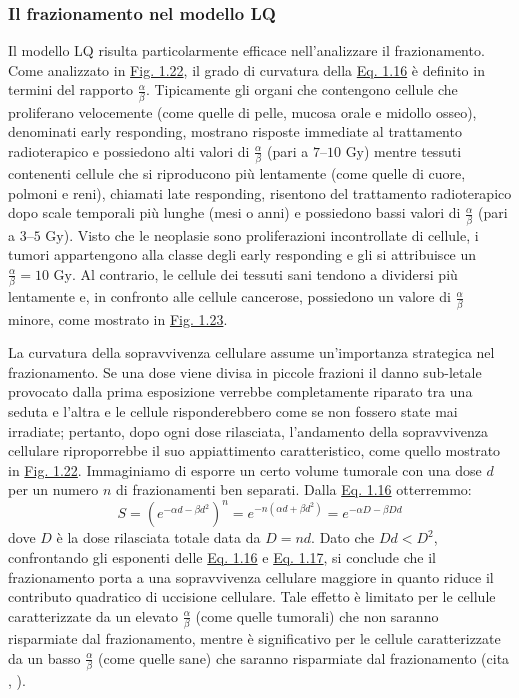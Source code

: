 \documentclass[12pt,a4paper,twoside]{report}
\begin{document}
	\subsubsection{Il frazionamento nel modello LQ}
	Il modello LQ risulta particolarmente efficace nell'analizzare il frazionamento. Come analizzato in \hyperref[fig:survival_cell]{Fig. 1.22}, il grado di curvatura della \hyperref[eq:survival2]{Eq. 1.16} è definito in termini del rapporto $\frac{\alpha}{\beta}$. Tipicamente gli organi che contengono cellule che proliferano velocemente (come quelle di pelle, mucosa orale e midollo osseo), denominati early responding, mostrano risposte immediate al trattamento radioterapico e possiedono alti valori di $\frac{\alpha}{\beta}$ (pari a $7$--$10\mbox{ Gy}$) mentre tessuti contenenti cellule che si riproducono più lentamente (come quelle di cuore, polmoni e reni), chiamati late responding, risentono del trattamento radioterapico dopo scale temporali più lunghe (mesi o anni) e possiedono bassi valori di $\frac{\alpha}{\beta}$ (pari a $3$--$5\mbox{ Gy}$). Visto che le neoplasie sono proliferazioni incontrollate di cellule, i tumori appartengono alla classe degli early responding e gli si attribuisce un $\frac{\alpha}{\beta}=10\mbox{ Gy}$. Al contrario, le cellule dei tessuti sani tendono a dividersi più lentamente e, in confronto alle cellule cancerose, possiedono un valore di $\frac{\alpha}{\beta}$ minore, come mostrato in \hyperref[fig:sparing]{Fig. 1.23}.
	
	La curvatura della sopravvivenza cellulare assume un'importanza strategica nel frazionamento. Se una dose viene divisa in piccole frazioni il danno sub-letale provocato dalla prima esposizione verrebbe completamente riparato tra una seduta e l'altra e le cellule risponderebbero come se non fossero state mai irradiate; pertanto, dopo ogni dose rilasciata, l'andamento della sopravvivenza cellulare riproporrebbe il suo appiattimento caratteristico, come quello mostrato in \hyperref[fig:survival_cell]{Fig. 1.22}. Immaginiamo di esporre un certo volume tumorale con una dose $d$ per un numero $n$ di frazionamenti ben separati. Dalla \hyperref[eq:survival2]{Eq. 1.16} otterremmo:
	\begin{equation}
		S=\left(e^{-\alpha d-\beta d^2}\right)^n=e^{-n\left(\alpha d+\beta d^2\right)}=e^{-\alpha D-\beta Dd}
		\label{eq:survival3}
	\end{equation}
	dove $D$ è la dose rilasciata totale data da $D=nd$. Dato che $Dd<D^2$, confrontando gli esponenti delle \hyperref[eq:survival2]{Eq. 1.16} e \hyperref[eq:survival3]{Eq. 1.17}, si conclude che il frazionamento porta a una sopravvivenza cellulare maggiore in quanto riduce il contributo quadratico di uccisione cellulare. Tale effetto è limitato per le cellule caratterizzate da un elevato $\frac{\alpha}{\beta}$ (come quelle tumorali) che non saranno risparmiate dal frazionamento, mentre è significativo per le cellule caratterizzate da un basso $\frac{\alpha}{\beta}$ (come quelle sane) che saranno risparmiate dal frazionamento (cita
	,
	).
	
\end{document}
